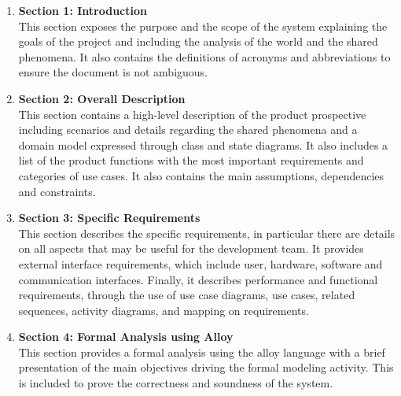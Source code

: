 \begin{enumerate}
    \item \textbf{Section 1: Introduction} \\
          This section exposes the purpose and the scope of the system explaining the goals of the project and including the analysis of the world and the shared phenomena.
          It also contains the definitions of acronyms and abbreviations to ensure the document is not ambiguous.
    \item \textbf{Section 2: Overall Description} \\
          This section contains a high-level description of the product prospective including scenarios and details regarding the shared phenomena and a domain model expressed through class and state diagrams. It also includes a list of the product functions with the most important requirements and categories of use cases. It also contains the main assumptions, dependencies and constraints.
          
    \item \textbf{Section 3: Specific Requirements} \\
          This section describes the specific requirements, in particular there are details on all aspects that may be useful for the development team.
          It provides external interface requirements, which include user, hardware, software and communication interfaces.
          Finally, it describes performance and functional requirements, through the use of use case diagrams, use cases, related sequences, activity diagrams, and mapping on requirements.
    \item \textbf{Section 4: Formal Analysis using Alloy} \\
        This section provides a formal analysis using the alloy language with a brief presentation of the main objectives driving the formal modeling activity. This is included to prove the correctness and soundness of the system.
\end{enumerate}
